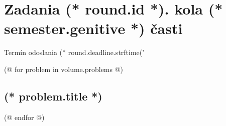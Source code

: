 \documentclass[12pt, twoside]{article}
\newcounter{volume}
\newcounter{semester}
\newcounter{round}
\newcounter{problem}
\begin{document}
    \pagestyle{main}
    \thispagestyle{first}
    \vspace*{2em}

    {
        \section{\texorpdfstring{Zadania (* round.id *). kola (* semester.genitive *) časti}{Zadania}}
        \centering
        \vspace{-1.3em}
        Termín odoslania (* round.deadline.strftime('%
    } 
        
    \pagestyle{problems}    

    (@ for problem in volume.problems @)%
    \setcounter{volume}{(* volume.number *)}%
    \setcounter{problem}{(* problem.number *)}%
    
    \subsection{%
        \texorpdfstring{%
            \large \textbf{(* problem.title *)}%
        }{%
            (* problem.title *)%
        }%
    }%
    (@ endfor @)
\end{document}
